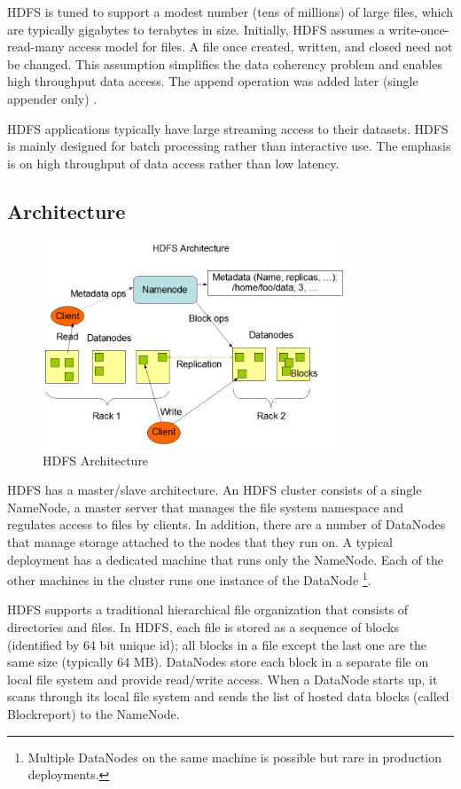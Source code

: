 \documentclass[12pt]{book}
\begin{document}
HDFS is tuned to support a modest number (tens of millions) of large files, which are typically gigabytes to terabytes in size. Initially, 
HDFS assumes a write-once-read-many access model for files. A file once created, written, and closed need not be changed. This assumption simplifies the data coherency problem and enables high throughput data access. The append operation was added later (single appender only) \cite{HDFS2010:265}.

HDFS applications typically have large streaming access to their datasets. HDFS is mainly designed for batch processing rather than interactive use. The emphasis is on high throughput of data access rather than low latency. 

\subsection{Architecture}
\begin{figure}[t]
\includegraphics[width=0.8\textwidth]{images/hdfs-architecture.png}
\centering
\caption{HDFS Architecture}
\end{figure}

HDFS has a master/slave architecture. An HDFS cluster consists of a single NameNode, a master server that manages the file system namespace and regulates access to files by clients. In addition, there are a number of DataNodes that manage storage attached to the nodes that they run on. A typical deployment has a dedicated machine that runs only the NameNode. Each of the other machines in the cluster runs one instance of the DataNode \footnote{Multiple DataNodes on the same machine is possible but rare in production deployments.}.

HDFS supports a traditional hierarchical file organization that consists of directories and files. In HDFS, each file is stored as a sequence of blocks (identified by 64 bit unique id); all blocks in a file except the last one are the same size (typically 64 MB). DataNodes store each block in a separate file  on local file system and provide read/write access. When a DataNode starts up, it scans through its local file system and sends the list of hosted data blocks (called Blockreport) to the NameNode.
\end{document}
